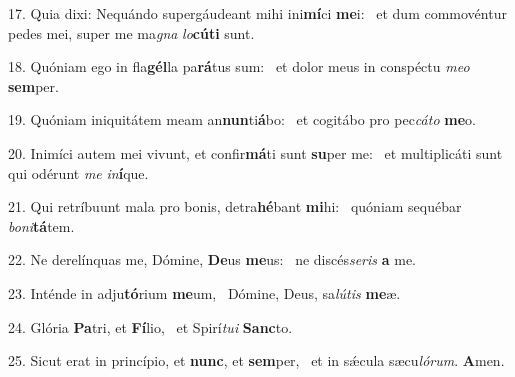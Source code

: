 17. Quia dixi: Nequándo supergáudeant mihi ini\textbf{mí}ci \textbf{me}i: \ast\  et dum commovéntur pedes mei, super me ma\textit{gna} \textit{lo}\textbf{cú}\textbf{ti} sunt.\

18. Quóniam ego in fla\textbf{gél}la pa\textbf{rá}tus sum: \ast\  et dolor meus in conspéctu \textit{me}\textit{o} \textbf{sem}per.\

19. Quóniam iniquitátem meam an\textbf{nun}ti\textbf{á}bo: \ast\  et cogitábo pro pec\textit{cá}\textit{to} \textbf{me}o.\

20. Inimíci autem mei vivunt, et confir\textbf{má}ti sunt \textbf{su}per me: \ast\  et multiplicáti sunt qui odérunt \textit{me} \textit{in}\textbf{í}que.\

21. Qui retríbuunt mala pro bonis, detra\textbf{hé}bant \textbf{mi}hi: \ast\  quóniam sequébar \textit{bo}\textit{ni}\textbf{tá}tem.\

22. Ne derelínquas me, Dómine, \textbf{De}us \textbf{me}us: \ast\  ne discés\textit{se}\textit{ris} \textbf{a} me.\

23. Inténde in adju\textbf{tó}rium \textbf{me}um, \ast\  Dómine, Deus, sa\textit{lú}\textit{tis} \textbf{me}æ.\

24. Glória \textbf{Pa}tri, et \textbf{Fí}lio, \ast\  et Spirí\textit{tu}\textit{i} \textbf{Sanc}to.\

25. Sicut erat in princípio, et \textbf{nunc}, et \textbf{sem}per, \ast\  et in sǽcula sæcu\textit{ló}\textit{rum}. \textbf{A}men.\

